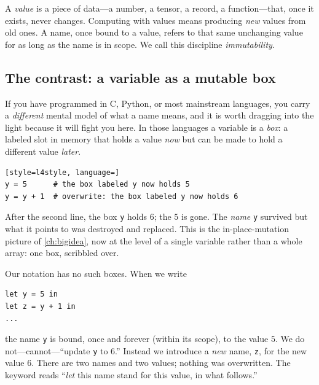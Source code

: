 \begin{definition}
A \emph{value} is a piece of data---a number, a tensor, a record, a function---that,
once it exists, never changes. Computing with values means producing \emph{new}
values from old ones. A name, once bound to a value, refers to that same
unchanging value for as long as the name is in scope. We call this discipline
\emph{immutability}.
\end{definition}

\subsection{The contrast: a variable as a mutable box}

If you have programmed in C, Python, or most mainstream languages, you carry a
\emph{different} mental model of what a name means, and it is worth dragging into
the light because it will fight you here. In those languages a variable is a
\emph{box}: a labeled slot in memory that holds a value \emph{now} but can be
made to hold a different value \emph{later}.

\begin{lstlisting}[style=l4style, language=]
y = 5      # the box labeled y now holds 5
y = y + 1  # overwrite: the box labeled y now holds 6
\end{lstlisting}

\noindent After the second line, the box \texttt{y} holds $6$; the $5$ is gone.
The \emph{name} \texttt{y} survived but what it points to was destroyed and
replaced. This is the in-place-mutation picture of \cref{ch:bigidea}, now at the
level of a single variable rather than a whole array: one box, scribbled over.

Our notation has no such boxes. When we write

\begin{lstlisting}[style=l4style]
let y = 5 in
let z = y + 1 in
...
\end{lstlisting}

\noindent the name \texttt{y} is bound, once and forever (within its scope), to
the value $5$. We do not---cannot---``update \texttt{y} to $6$.'' Instead we
introduce a \emph{new} name, \texttt{z}, for the new value $6$. There are two
names and two values; nothing was overwritten. The  keyword reads
``\emph{let} this name stand for this value, in what follows.''

